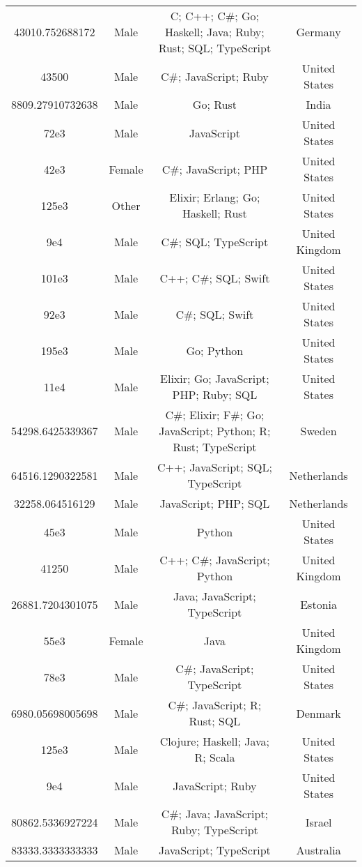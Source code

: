 \begin{center}
\begin{tabular}{ |c|c|c|c| }
43010.752688172  &  Male  &  C; C++; C\#; Go; Haskell; Java; Ruby; Rust; SQL; TypeScript  &  Germany  \\ 
43500  &  Male  &  C\#; JavaScript; Ruby  &  United States  \\ 
8809.27910732638  &  Male  &  Go; Rust  &  India  \\ 
72e3  &  Male  &  JavaScript  &  United States  \\ 
42e3  &  Female  &  C\#; JavaScript; PHP  &  United States  \\ 
125e3  &  Other  &  Elixir; Erlang; Go; Haskell; Rust  &  United States  \\ 
9e4  &  Male  &  C\#; SQL; TypeScript  &  United Kingdom  \\ 
101e3  &  Male  &  C++; C\#; SQL; Swift  &  United States  \\ 
92e3  &  Male  &  C\#; SQL; Swift  &  United States  \\ 
195e3  &  Male  &  Go; Python  &  United States  \\ 
11e4  &  Male  &  Elixir; Go; JavaScript; PHP; Ruby; SQL  &  United States  \\ 
54298.6425339367  &  Male  &  C\#; Elixir; F\#; Go; JavaScript; Python; R; Rust; TypeScript  &  Sweden  \\ 
64516.1290322581  &  Male  &  C++; JavaScript; SQL; TypeScript  &  Netherlands  \\ 
32258.064516129  &  Male  &  JavaScript; PHP; SQL  &  Netherlands  \\ 
45e3  &  Male  &  Python  &  United States  \\ 
41250  &  Male  &  C++; C\#; JavaScript; Python  &  United Kingdom  \\ 
26881.7204301075  &  Male  &  Java; JavaScript; TypeScript  &  Estonia  \\ 
55e3  &  Female  &  Java  &  United Kingdom  \\ 
78e3  &  Male  &  C\#; JavaScript; TypeScript  &  United States  \\ 
6980.05698005698  &  Male  &  C\#; JavaScript; R; Rust; SQL  &  Denmark  \\ 
125e3  &  Male  &  Clojure; Haskell; Java; R; Scala  &  United States  \\ 
9e4  &  Male  &  JavaScript; Ruby  &  United States  \\ 
80862.5336927224  &  Male  &  C\#; Java; JavaScript; Ruby; TypeScript  &  Israel  \\ 
83333.3333333333  &  Male  &  JavaScript; TypeScript  &  Australia  \\ 

\end{tabular}
\end{center}

